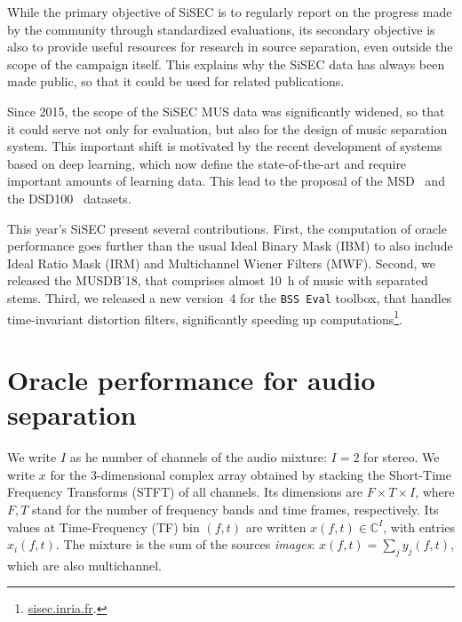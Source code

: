 \documentclass{llncs}
\newcommand{\ft}{\left(f,t\right)}
\begin{document}

While the primary objective of SiSEC is to regularly report on the progress made by the community through standardized evaluations, its secondary objective is also to provide useful resources for research in source separation, even outside the scope of the campaign itself. This explains why the SiSEC data has always been made public, so that it could be used for related publications. %

Since 2015, the scope of the SiSEC MUS data was significantly widened, so that it could serve not only for evaluation, but also for the design of music separation system. This important shift is motivated by the recent development of systems based on deep learning, which now define the state-of-the-art and require important amounts of learning data. This lead to the proposal of the MSD~\cite{sisec2015} and the DSD100~\cite{sisec2016} datasets.%

This year's SiSEC present several contributions. First, the computation of oracle performance goes further than the usual Ideal Binary Mask (IBM) to also include Ideal Ratio Mask (IRM) and Multichannel Wiener Filters (MWF). Second, we released the MUSDB'18, that comprises almost 10~h of music with separated stems. Third, we released a new version~4 for the \texttt{BSS~Eval} toolbox, that handles time-invariant distortion filters, significantly speeding up computations\footnote{\url{sisec.inria.fr}.}.

\section{Oracle performance for audio separation}
\label{sec:oracle}

We write $I$ as he number of channels of the audio mixture: $I=2$ for stereo. We write $x$ for the 3-dimensional complex array obtained by stacking the Short-Time Frequency Transforms (STFT) of all channels. Its dimensions are $F\times T\times I$, where $F,T$ stand for the number of frequency bands and time frames, respectively. Its values at Time-Frequency (TF) bin $\ft$ are  written $x\ft\in\mathbb{C}^I$, with entries $x_i\ft$. The mixture is the sum of the sources \textit{images}: $x\ft=\sum_j y_j\ft$, which are also multichannel.
\end{document}
